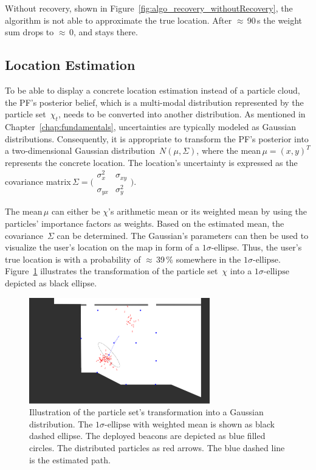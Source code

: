 Without recovery, shown in Figure~\ref{fig:algo_recovery_withoutRecovery}, the algorithm is not able to approximate the true location. After $\approx$\,90\,s the weight sum drops to $\approx$\,0, and stays there.


\subsection{Location Estimation}\label{sec:algo_locEstimation}
To be able to display a concrete location estimation instead of a particle cloud, the \acs{PF}'s posterior belief, which is a multi-modal distribution represented by the particle set~$\chi_t$, needs to be converted into another distribution. As mentioned in Chapter~\ref{chap:fundamentals}, uncertainties are typically modeled as Gaussian distributions. Consequently, it is appropriate to transform the \acs{PF}'s posterior into a two-dimensional Gaussian distribution~$N(\mu, \Sigma)$, where the mean\,$\mu = (x, y)^T$ represents the concrete location. The location's uncertainty is expressed as the covariance matrix\,$\Sigma = \bigl(\begin{smallmatrix} \sigma_{x}^2&\sigma_{xy}\\ \sigma_{yx}&\sigma_{y}^2 \end{smallmatrix} \bigr)$.

The mean\,$\mu$ can either be $\chi$'s arithmetic mean or its weighted mean by using the particles' importance factors as weights. Based on the estimated mean, the covariance~$\Sigma$ can be determined. The Gaussian's parameters can then be used to visualize the user's location on the map in form of a $1\sigma\text{-ellipse}$. Thus, the user's true location is with a probability of $\approx$\,39\,\% somewhere in the $1\sigma\text{-ellipse}$. Figure~\ref{fig:algo_sigellipse} illustrates the transformation of the particle set~$\chi$ into a  $1\sigma\text{-ellipse}$ depicted as black ellipse.

\begin{figure}
	\includegraphics[width=0.7\textwidth]{figures/sigellipse}
	\caption{Illustration of the particle set's transformation into a Gaussian distribution. The $1\sigma\text{-ellipse}$ with weighted mean is shown as black dashed ellipse. The deployed beacons are depicted as blue filled circles. The distributed particles as red arrows. The blue dashed line is the estimated path.}
	\label{fig:algo_sigellipse}
\end{figure}
